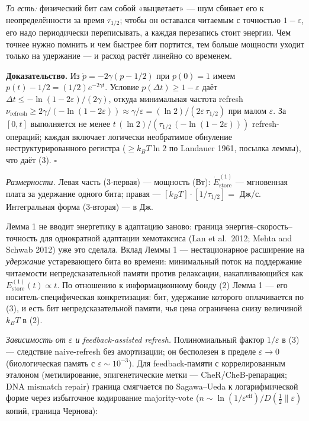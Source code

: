 \documentclass[pdflatex,sn-mathphys-ay]{sn-jnl}
\begin{document}
\emph{То есть:} физический бит сам собой «выцветает» --- шум сбивает его к неопределённости за время \(\tau_{1/2}\); чтобы он оставался читаемым с точностью \(1-\varepsilon\), его надо периодически переписывать, а каждая перезапись стоит энергии. Чем точнее нужно помнить и чем быстрее бит портится, тем больше мощности уходит только на удержание --- и расход растёт линейно со временем.



\textbf{Доказательство.} Из \(\dot p = -2\gamma(p - 1/2)\) при \(p(0) = 1\) имеем \(p(t) - 1/2 = (1/2) e^{-2\gamma t}\). Условие \(p(\Delta t) \ge 1 - \varepsilon\) даёт \(\Delta t \le -\ln(1 - 2\varepsilon)/(2\gamma)\), откуда минимальная частота refresh \(\nu_{\text{refresh}} \ge 2\gamma/(-\ln(1 - 2\varepsilon)) \approx \gamma/\varepsilon = (\ln 2)/(2\varepsilon\, \tau_{1/2})\) при малом \(\varepsilon\). За \([0,t]\) выполняется не менее \(t\,(\ln 2)/(\tau_{1/2}\,(-\ln(1 - 2\varepsilon)))\) refresh-операций; каждая включает логически необратимое обнуление неструктурированного регистра (\(\ge k_B T \ln 2\) по Landauer 1961, посылка леммы), что даёт (3). \(\square\)



\emph{Размерности.} Левая часть (3-первая) --- мощность (Вт): \(\dot E_{\text{store}}^{(1)}\) --- мгновенная плата за удержание одного бита; правая --- \([k_B T] \cdot [1/\tau_{1/2}] =\) Дж/с. Интегральная форма (3-вторая) --- в Дж.



Лемма 1 не вводит энергетику в адаптацию заново: граница энергия--скорость--точность для однократной адаптации хемотаксиса (Lan et al.~2012; Mehta and Schwab 2012) уже это сделала. Вклад Леммы 1 --- нестационарное расширение на \emph{удержание} устаревающего бита во времени: минимальный поток на поддержание читаемости непредсказательной памяти против релаксации, накапливающийся как \(E_{\text{store}}^{(1)}(t) \propto t\). По отношению к информационному бонду (2) Лемма 1 --- его носитель-специфическая конкретизация: бит, удержание которого оплачивается по (3), и есть бит непредсказательной памяти, чья цена ограничена снизу величиной \(k_B T\) в (2).



\emph{Зависимость от \(\varepsilon\) и feedback-assisted refresh.} Полиномиальный фактор \(1/\varepsilon\) в (3) --- следствие naive-refresh без амортизации; он бесполезен в пределе \(\varepsilon \to 0\) (биологическая память с \(\varepsilon \sim 10^{-3}\)). Для feedback-памяти с коррелированным эталоном (метилирование, эпигенетические метки --- CheR/CheB-репарация; DNA mismatch repair) граница смягчается по Sagawa--Ueda к логарифмической форме через избыточное кодирование majority-vote (\(n \sim \ln(1/\varepsilon^{\text{eff}})/D(\tfrac12\|\varepsilon)\) копий, граница Чернова):
\end{document}
